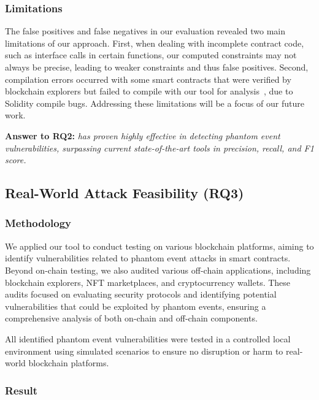 \subsubsection{Limitations}

The false positives and false negatives in our evaluation revealed two main limitations of our approach. First, when dealing with incomplete contract code, such as interface calls in certain functions, our computed constraints may not always be precise, leading to weaker constraints and thus false positives. Second, compilation errors occurred with some smart contracts that were verified by blockchain explorers but failed to compile with our tool for analysis~\cite{compile_issue}, due to Solidity compile bugs. Addressing these limitations will be a focus of our future work.


\vspace{\baselineskip}
\begin{mdframed}
\noindent\textbf{Answer to RQ2:} \textit{\tool has proven highly effective in detecting phantom event vulnerabilities, surpassing current state-of-the-art tools in precision, recall, and F1 score.}
\end{mdframed}

\subsection{Real-World Attack Feasibility (RQ3)}
\subsubsection{Methodology}
We applied our tool to conduct testing on various blockchain platforms, aiming to identify vulnerabilities related to phantom event attacks in smart contracts. Beyond on-chain testing, we also audited various off-chain applications, including blockchain explorers, NFT marketplaces, and cryptocurrency wallets. These audits focused on evaluating security protocols and identifying potential vulnerabilities that could be exploited by phantom events, ensuring a comprehensive analysis of both on-chain and off-chain components.

All identified phantom event vulnerabilities were tested in a controlled local environment using simulated scenarios to ensure no disruption or harm to real-world blockchain platforms.

\subsubsection{Result}

